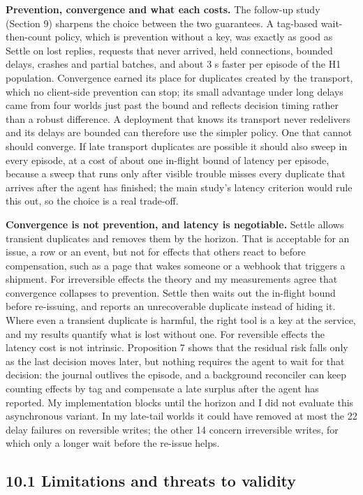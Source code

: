 \documentclass[
  10pt,
]{article}
\begin{document}
\textbf{Prevention, convergence and what each costs.} The follow-up
study (Section 9) sharpens the choice between the two guarantees. A
tag-based wait-then-count policy, which is prevention without a key, was
exactly as good as Settle on lost replies, requests that never arrived,
held connections, bounded delays, crashes and partial batches, and about
3 s faster per episode of the H1 population. Convergence earned its
place for duplicates created by the transport, which no client-side
prevention can stop; its small advantage under long delays came from
four worlds just past the bound and reflects decision timing rather than
a robust difference. A deployment that knows its transport never
redelivers and its delays are bounded can therefore use the simpler
policy. One that cannot should converge. If late transport duplicates
are possible it should also sweep in every episode, at a cost of about
one in-flight bound of latency per episode, because a sweep that runs
only after visible trouble misses every duplicate that arrives after the
agent has finished; the main study's latency criterion would rule this
out, so the choice is a real trade-off.

\textbf{Convergence is not prevention, and latency is negotiable.}
Settle allows transient duplicates and removes them by the horizon. That
is acceptable for an issue, a row or an event, but not for effects that
others react to before compensation, such as a page that wakes someone
or a webhook that triggers a shipment. For irreversible effects the
theory and my measurements agree that convergence collapses to
prevention. Settle then waits out the in-flight bound before re-issuing,
and reports an unrecoverable duplicate instead of hiding it. Where even
a transient duplicate is harmful, the right tool is a key at the
service, and my results quantify what is lost without one. For
reversible effects the latency cost is not intrinsic. Proposition 7
shows that the residual risk falls only as the last decision moves
later, but nothing requires the agent to wait for that decision: the
journal outlives the episode, and a background reconciler can keep
counting effects by tag and compensate a late surplus after the agent
has reported. My implementation blocks until the horizon and I did not
evaluate this asynchronous variant. In my late-tail worlds it could have
removed at most the 22 delay failures on reversible writes; the other 14
concern irreversible writes, for which only a longer wait before the
re-issue helps.

\hypertarget{limitations-and-threats-to-validity}{%
\subsection*{10.1 Limitations and threats to
validity}\label{limitations-and-threats-to-validity}}
\end{document}
